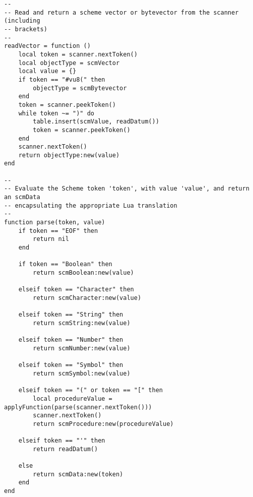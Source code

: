 \begin{verbatim}
--
-- Read and return a scheme vector or bytevector from the scanner (including
-- brackets)
--
readVector = function ()
    local token = scanner.nextToken()
    local objectType = scmVector
    local value = {}
    if token == "#vu8(" then
        objectType = scmBytevector
    end
    token = scanner.peekToken()
    while token ~= ")" do
        table.insert(scmValue, readDatum())
        token = scanner.peekToken()
    end
    scanner.nextToken()
    return objectType:new(value)
end

--
-- Evaluate the Scheme token 'token', with value 'value', and return an scmData
-- encapsulating the appropriate Lua translation
--
function parse(token, value)
    if token == "EOF" then
        return nil
    end

    if token == "Boolean" then
        return scmBoolean:new(value)

    elseif token == "Character" then
        return scmCharacter:new(value)

    elseif token == "String" then
        return scmString:new(value)

    elseif token == "Number" then
        return scmNumber:new(value)

    elseif token == "Symbol" then
        return scmSymbol:new(value)

    elseif token == "(" or token == "[" then
        local procedureValue = applyFunction(parse(scanner.nextToken()))
        scanner.nextToken()
        return scmProcedure:new(procedureValue)

    elseif token == "'" then
        return readDatum()

    else
        return scmData:new(token)
    end
end
\end{verbatim}

